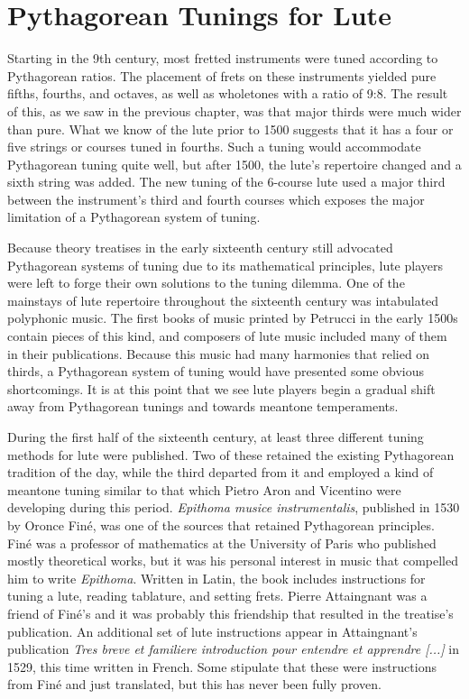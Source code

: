 \section{Pythagorean Tunings for Lute}

Starting in the 9th century, most fretted instruments were tuned according to Pythagorean ratios. The placement of
frets on these instruments yielded pure fifths, fourths, and octaves, as well as wholetones with a ratio of 9:8.
\autocite[9]{ML:1} The result of this, as we saw in the previous chapter, was that major thirds were much wider than
pure. What we know of the lute prior to 1500 suggests that it has a four or five strings or courses tuned in fourths.
Such a tuning would accommodate Pythagorean tuning quite well, but after 1500, the lute's repertoire changed and a sixth
string was added. The new tuning of the 6-course lute used a major third between the instrument's third and fourth
courses which exposes the major limitation of a Pythagorean system of tuning.

Because theory treatises in the early sixteenth century still advocated Pythagorean systems of tuning due to its
mathematical principles, lute players were left to forge their own solutions to the tuning dilemma. One of the
mainstays of lute repertoire throughout the sixteenth century was intabulated polyphonic music. The first books of music
printed by Petrucci in the early 1500s contain pieces of this kind, and composers of lute music included many of them in
their publications. Because this music had many harmonies that relied on thirds, a Pythagorean system of tuning would
have presented some obvious shortcomings. It is at this point that we see lute players begin a gradual shift away from
Pythagorean tunings and towards meantone temperaments.

During the first half of the sixteenth century, at least three different tuning methods for lute were published. Two of
these retained the existing Pythagorean tradition of the day, while the third departed from it and employed a kind of
meantone tuning similar to that which Pietro Aron and Vicentino were developing during this period. \textit{Epithoma
musice instrumentalis}, published in 1530 by Oronce Fin\'{e}, was one of the sources that retained Pythagorean
principles. Fin\'{e} was a professor of mathematics at the University of Paris who published mostly theoretical works,
but it was his personal interest in music that compelled him to write \textit{Epithoma}. Written in Latin, the book
includes instructions for tuning a lute, reading tablature, and setting frets. Pierre Attaingnant was a friend of
Fin\'{e}'s and it was probably this friendship that resulted in the treatise's publication. An additional set of lute
instructions appear in Attaingnant's publication \textit{Tres breve et familiere introduction pour entendre et apprendre
[...]} in 1529, this time written in French. Some stipulate that these were instructions from Fin\'{e} and just
translated, but this has never been fully proven.\autocite[1]{PV:1}

